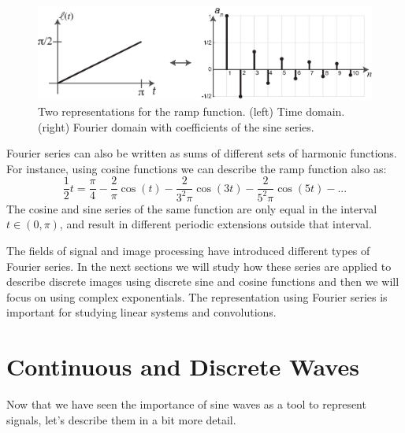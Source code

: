 \begin{figure}[t]
\centerline{
    \includegraphics[width=.9\linewidth]{figures/Image_processing_fourier/FourierSeries5_representation.eps}
}
\caption{Two representations for the ramp 
function. (left) Time domain. (right) Fourier domain with coefficients of the sine series.%
}
\label{fig:FourierSeries5_representation}
\end{figure}

Fourier series can also be written as sums of different sets of harmonic functions. For instance, using cosine functions we can describe the ramp function also as: 
\begin{equation}
\frac{1}{2} t =  \frac{\pi}{4}  - \frac{2}{\pi} \cos (t) - \frac{2}{3^2 \pi}  \cos (3t) - \frac{2}{5^2 \pi}  \cos (5t) - ...
\end{equation}
 The cosine and sine series of the same function are only equal in the interval $t \in (0, \pi)$, and result in different periodic extensions outside that interval.

The fields of signal and image processing have introduced different types of Fourier series. In the next sections we will study how these series are applied to describe discrete images using discrete sine and cosine functions and then we will focus on using complex exponentials. The representation using Fourier series is important for studying linear systems and convolutions. 

\section{Continuous and Discrete Waves}

Now that we have seen the importance of sine waves as a tool to represent signals, let's describe them in a bit more detail.  


